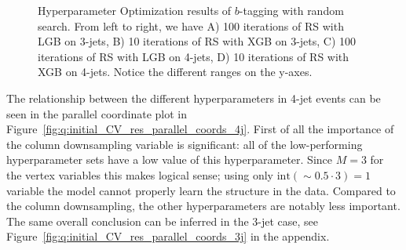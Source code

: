 \begin{figure}%
  \centering
  \;
  \vspace{2mm}
  \caption[Hyperparameter Optimization of $b$-tagging]{
    Hyperparameter Optimization results of $b$-tagging with random search. From left to right, we have A) \num{100} iterations of RS with LGB on 3-jets, B) \num{10} iterations of RS with XGB on 3-jets, C) \num{100} iterations of RS with LGB on 4-jets, D) \num{10} iterations of RS with XGB on 4-jets. Notice the different ranges on the y-axes.}
  \label{fig:q:CV_res_iterations_b_tagging}%
\end{figure}
\vspace{0.5cm}

The relationship between the different hyperparameters in 4-jet events can be seen in the parallel coordinate plot in Figure~\ref{fig:q:initial_CV_res_parallel_coords_4j}. First of all the importance of the column downsampling  variable is significant: all of the low-performing hyperparameter sets have a low value of this hyperparameter. Since $M=3$ for the vertex variables this makes logical sense; using only $\mathrm{int}(\sim 0.5 \cdot 3) = 1$ variable the model cannot properly learn the structure in the data. Compared to the column downsampling, the other hyperparameters are notably less important. The same overall conclusion can be inferred in the 3-jet case, see Figure~\ref{fig:q:initial_CV_res_parallel_coords_3j} in the appendix.

